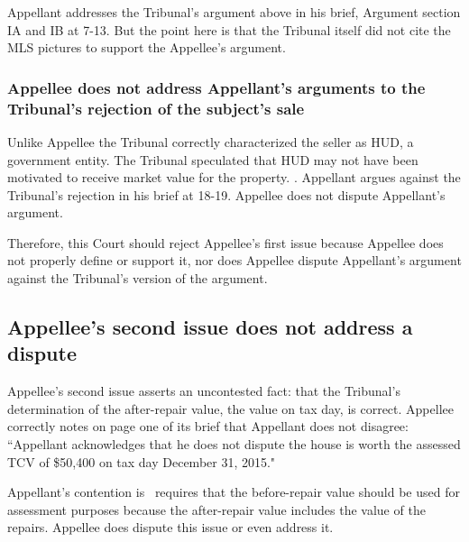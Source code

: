 \documentclass[12pt,\documentclassflag]{michiganCourtOfAppealsBrief}
\begin{document}
Appellant addresses the Tribunal's argument above in his brief, Argument section IA and IB at 7-13. But the point here is that the Tribunal itself did not cite the MLS pictures to support the Appellee's argument.

\subsubsection{Appellee does not address Appellant's arguments to the Tribunal's rejection of the subject's sale}

Unlike Appellee the Tribunal correctly characterized the seller as HUD, a government entity. The Tribunal speculated that HUD may not have been motivated to receive market value for the property. \reconsiderationDenied[2]. Appellant argues against the Tribunal's rejection in his brief at 18-19. Appellee does not dispute Appellant's argument. 

Therefore, this Court should reject Appellee's first issue because Appellee does not properly define or support it, nor does Appellee dispute Appellant's argument against the Tribunal's version of the argument.





\subsection{Appellee's second issue does not address a dispute}

Appellee's second issue asserts an uncontested fact: that the Tribunal's determination of the after-repair value, the value on tax day, is correct. Appellee correctly notes on page one of its brief that Appellant does not disagree: ``Appellant acknowledges that he does not dispute the house is worth the assessed TCV of \$50,400 on tax day December 31, 2015."

Appellant's contention is \mathieuGast\ requires that the before-repair value should be used for assessment purposes because the after-repair value includes the value of the repairs. Appellee does dispute this issue or even address it.
\end{document}
